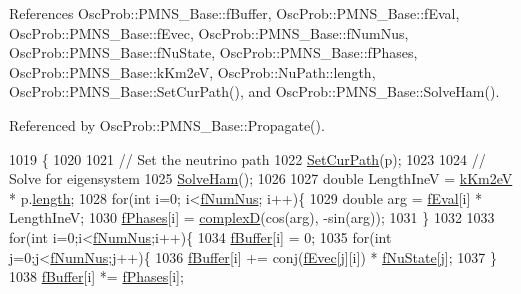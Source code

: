 References Osc\+Prob\+::\+P\+M\+N\+S\+\_\+\+Base\+::f\+Buffer, Osc\+Prob\+::\+P\+M\+N\+S\+\_\+\+Base\+::f\+Eval, Osc\+Prob\+::\+P\+M\+N\+S\+\_\+\+Base\+::f\+Evec, Osc\+Prob\+::\+P\+M\+N\+S\+\_\+\+Base\+::f\+Num\+Nus, Osc\+Prob\+::\+P\+M\+N\+S\+\_\+\+Base\+::f\+Nu\+State, Osc\+Prob\+::\+P\+M\+N\+S\+\_\+\+Base\+::f\+Phases, Osc\+Prob\+::\+P\+M\+N\+S\+\_\+\+Base\+::k\+Km2eV, Osc\+Prob\+::\+Nu\+Path\+::length, Osc\+Prob\+::\+P\+M\+N\+S\+\_\+\+Base\+::\+Set\+Cur\+Path(), and Osc\+Prob\+::\+P\+M\+N\+S\+\_\+\+Base\+::\+Solve\+Ham().



Referenced by Osc\+Prob\+::\+P\+M\+N\+S\+\_\+\+Base\+::\+Propagate().


\begin{DoxyCode}
1019 \{
1020 
1021   \textcolor{comment}{// Set the neutrino path}
1022   \hyperlink{classOscProb_1_1PMNS__Base_a986e6ebef09a7e2eb7fee16a4c2c834d}{SetCurPath}(p);
1023 
1024   \textcolor{comment}{// Solve for eigensystem}
1025   \hyperlink{classOscProb_1_1PMNS__Base_a91f065cb9e910e0095e41462b4420b01}{SolveHam}();
1026 
1027   \textcolor{keywordtype}{double} LengthIneV = \hyperlink{classOscProb_1_1PMNS__Base_a382ddd7b76ca89b43f22614a2ea7327b}{kKm2eV} * p.\hyperlink{structOscProb_1_1NuPath_af22660894b6e25cf835500381b155557}{length};
1028   \textcolor{keywordflow}{for}(\textcolor{keywordtype}{int} i=0; i<\hyperlink{classOscProb_1_1PMNS__Base_a24bb74bed63569dfe88b18fa6a08060e}{fNumNus}; i++)\{
1029     \textcolor{keywordtype}{double} arg = \hyperlink{classOscProb_1_1PMNS__Base_a6319c34d7decbb9d7d6da279c06e8c2d}{fEval}[i] * LengthIneV;
1030     \hyperlink{classOscProb_1_1PMNS__Base_ab8d26b722047d49d977f5f2d83026ede}{fPhases}[i] = \hyperlink{EigenPoint_8h_a67ca8e107e20610c3fff78d5e726ece0}{complexD}(cos(arg), -sin(arg));
1031   \}
1032   
1033   \textcolor{keywordflow}{for}(\textcolor{keywordtype}{int} i=0;i<\hyperlink{classOscProb_1_1PMNS__Base_a24bb74bed63569dfe88b18fa6a08060e}{fNumNus};i++)\{
1034     \hyperlink{classOscProb_1_1PMNS__Base_a5440bc3efa466a37649601abce559e3e}{fBuffer}[i] = 0;
1035     \textcolor{keywordflow}{for}(\textcolor{keywordtype}{int} j=0;j<\hyperlink{classOscProb_1_1PMNS__Base_a24bb74bed63569dfe88b18fa6a08060e}{fNumNus};j++)\{
1036       \hyperlink{classOscProb_1_1PMNS__Base_a5440bc3efa466a37649601abce559e3e}{fBuffer}[i] += conj(\hyperlink{classOscProb_1_1PMNS__Base_a87be137356c5f27ab83cab5e1298ef8f}{fEvec}[j][i]) * \hyperlink{classOscProb_1_1PMNS__Base_abf99f2339e3ee989600740b5d88063e8}{fNuState}[j];
1037     \}
1038     \hyperlink{classOscProb_1_1PMNS__Base_a5440bc3efa466a37649601abce559e3e}{fBuffer}[i] *= \hyperlink{classOscProb_1_1PMNS__Base_ab8d26b722047d49d977f5f2d83026ede}{fPhases}[i];

\end{DoxyCode}
